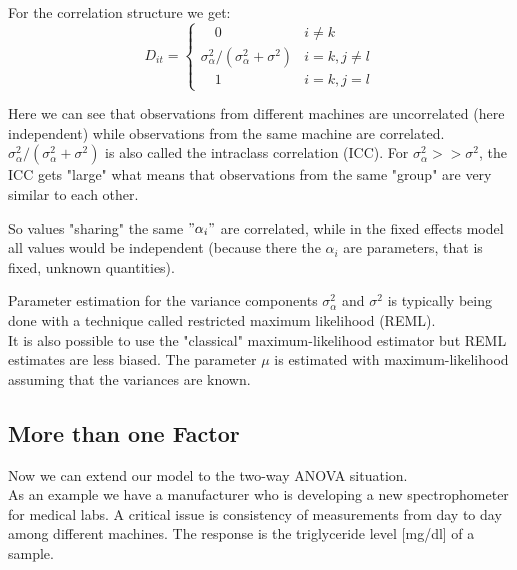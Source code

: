 \documentclass[unknownkeysallowed]{beamer}
\begin{document}
	\begin{frame}
		For the correlation structure we get:
		\begin{equation*}
		D_{it} =
		\begin{cases}
		\quad 0 & i \neq k\\
		\sigma^2_{\alpha}/(\sigma^2_{\alpha} + \sigma^2) & i = k, j\neq l\\
		\quad 1 & i=k, j=l
		\end{cases}
		\end{equation*}
		
		Here we can see that observations from different machines are uncorrelated (here independent) while observations from the same machine are correlated. \\
		$\sigma^2_{\alpha}/(\sigma^2_{\alpha} + \sigma^2)$ is also called the intraclass correlation (ICC). For $\sigma^2_{\alpha} >> \sigma^2$, the ICC gets "large" what means that observations from the same "group" are very similar to each other.
		
		So values "sharing" the same $"\alpha_i "$ are correlated, while in the fixed effects model all values would be independent (because there the $\alpha_i$ are parameters, that is fixed, unknown quantities).
	\end{frame}
	
	\begin{frame}
		Parameter estimation for the variance components $\sigma^2_{\alpha}$ and $\sigma^2$ is typically being done with a technique called restricted maximum likelihood (REML).\\
		It is also possible to use the "classical" maximum-likelihood estimator but REML estimates are less biased. The parameter $\mu$ is estimated with maximum-likelihood assuming that the variances are known. 
	\end{frame}
	\subsection{More than one Factor}
	\begin{frame}
		Now we can extend our model to the two-way ANOVA situation.\\
		As an example we have a manufacturer who is developing a new spectrophometer for medical labs. A critical issue is consistency of measurements from day to day among different machines. The response is the triglyceride level [mg/dl] of a sample.
	\end{frame}
	
\end{document}
